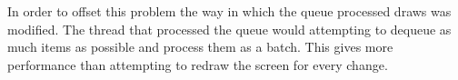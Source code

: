 In order to offset this problem the way in which the queue processed draws was modified. The thread that processed the queue would attempting to dequeue as much items as possible and process them as a batch. This gives more performance than attempting to redraw the screen for every change.









